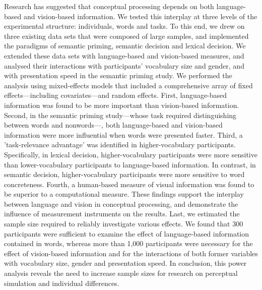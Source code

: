 \documentclass[
  12pt,
  man,floatsintext]{apa7}
\begin{document}
\bigskip
\bigskip
\bigskip

\begin{adjustwidth}{1.5cm}{1.5cm}

Research has suggested that conceptual processing depends on both language-based and vision-based information. We tested this interplay at three levels of the experimental structure: individuals, words and tasks. To this end, we drew on three existing data sets that were composed of large samples, and implemented the paradigms of semantic priming, semantic decision and lexical decision. We extended these data sets with language-based and vision-based measures, and analysed their interactions with participants' vocabulary size and gender, and with presentation speed in the semantic priming study. We performed the analysis using mixed-effects models that included a comprehensive array of fixed effects---including covariates---and random effects. First, language-based information was found to be more important than vision-based information. Second, in the semantic priming study---whose task required distinguishing between words and nonwords---, both language-based and vision-based information were more influential when words were presented faster. Third, a 'task-relevance advantage' was identified in higher-vocabulary participants. Specifically, in lexical decision, higher-vocabulary participants were more sensitive than lower-vocabulary participants to language-based information. In contrast, in semantic decision, higher-vocabulary participants were more sensitive to word concreteness. Fourth, a human-based measure of visual information was found to be superior to a computational measure. These findings support the interplay between language and vision in conceptual processing, and demonstrate the influence of measurement instruments on the results. Last, we estimated the sample size required to reliably investigate various effects. We found that 300 participants were sufficient to examine the effect of language-based information contained in words, whereas more than 1,000 participants were necessary for the effect of vision-based information and for the interactions of both former variables with vocabulary size, gender and presentation speed. In conclusion, this power analysis reveals the need to increase sample sizes for research on perceptual simulation and individual differences.

\end{adjustwidth}

\bigskip
\bigskip
\bigskip
\end{document}
